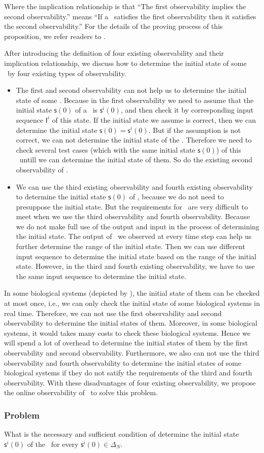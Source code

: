 Where the implication relationship is that ``The first observability implies the second observability.'' means ``If a \BCN\ satisfies the first observability then it satisfies the second observability.'' For the details of the proving process of this proposition, we refer readers to \cite{Zhang2016Observability}.
   
After introducing the definition of four existing observability and their implication relationship, we discuss how to determine the initial state of some \BCNs\ by four existing types of observability. 
\begin{itemize}
\item The first and second observability can not help us to determine the initial state of some \BCNs. Because in the first observability we need to assume that the initial state $\mathsf{s}(0)$ of a \BCN\ is $\mathsf{s}^{i}(0)$, and then check it by corresponding input sequence $\mathsf{I}^{i}$ of this state. If the initial state we assume is correct, then we can determine the initial state $\mathsf{s}(0)=\mathsf{s}^{i}(0)$. But if the assumption is not correct, we can not determine the initial state of the \BCN. Therefore we need to check several test cases (which with the same initial state $\mathsf{s}(0)$) of this \BCN\ untill we can determine the initial state of them. So do the existing second observability of \BCNs.
\item We can use the third existing observability and fourth existing observability to determine the initial state $\mathsf{s}(0)$ of \BCNs, because we do not need to presuppose the initial state. But the requirements for \BCNs\ are very difficult to meet when we use the third observability and fourth observability. Because we do not make full use of the output and input in the process of determining the initial state. The output of \BCNs\ we observed at every time step can help us further determine the range of the initial state. Then we can use different input sequence to determine the initial state based on the range of the initial state. However, in the third and fourth existing observability, we have to use the same input sequence to determine the initial state.
\end{itemize} 
 
In some biological systems (depicted by \BCNs), the initial state of them can be checked at most once, i.e., we can only check the initial state of some biological systems in real time. Therefore, we can not use the first observability and second observability to determine the initial states of them. Moreover, in some biological systems, it would takes many costs to check these biological systems. Hence we will spend a lot of overhead to determine the initial states of them by the first observability and second observability. Furthermore, we also can not use the third observability and fourth observability to determine the initial states of some biological systems if they do not satify the requirements of the third and fourth observability. With these disadvantages of four existing observability, we propose the online observability of \BCNs\ to solve this problem.
 \subsubsection*{Problem}
What is the necessary and sufficient condition of determine the initial state $\mathsf{s}^{i}(0)$ of the \BCN\ for every $\mathsf{s}^{i}(0)\in\Delta_N$.